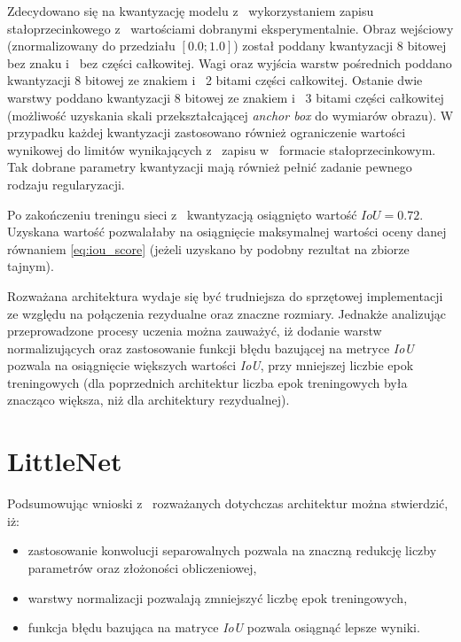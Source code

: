Zdecydowano się na kwantyzację modelu z~ wykorzystaniem zapisu stałoprzecinkowego z~ wartościami dobranymi eksperymentalnie. 
Obraz wejściowy (znormalizowany do przedziału $[0.0;1.0]$) został poddany kwantyzacji 8 bitowej bez znaku i~ bez części całkowitej. 
Wagi oraz wyjścia warstw pośrednich poddano kwantyzacji 8 bitowej ze znakiem i~ 2 bitami części całkowitej.
Ostanie dwie warstwy poddano kwantyzacji 8 bitowej ze znakiem i~ 3 bitami części całkowitej (możliwość uzyskania skali przekształcającej \emph{anchor box} do wymiarów obrazu).
W przypadku każdej kwantyzacji zastosowano również ograniczenie wartości wynikowej do limitów wynikających z~ zapisu w~ formacie stałoprzecinkowym. 
Tak dobrane parametry kwantyzacji mają również pełnić zadanie pewnego rodzaju regularyzacji.

Po zakończeniu treningu sieci z~ kwantyzacją osiągnięto wartość $IoU = 0.72$.
Uzyskana wartość pozwalałaby na osiągnięcie maksymalnej wartości oceny 
danej równaniem \eqref{eq:iou_score} (jeżeli uzyskano by podobny rezultat na zbiorze tajnym).

Rozważana architektura wydaje się być trudniejsza do sprzętowej implementacji ze względu na połączenia rezydualne oraz znaczne rozmiary. 
Jednakże analizując przeprowadzone procesy uczenia można zauważyć, iż dodanie warstw normalizujących oraz zastosowanie funkcji błędu bazującej na metryce \emph{IoU} pozwala na osiągnięcie większych wartości \emph{IoU}, przy mniejszej liczbie epok treningowych 
(dla poprzednich architektur liczba epok treningowych była znacząco większa, niż dla architektury rezydualnej). 


\section{LittleNet}
\label{ch:LN}

Podsumowując wnioski z~ rozważanych dotychczas architektur można stwierdzić, iż:
\begin{itemize}
    \item zastosowanie konwolucji separowalnych pozwala na znaczną redukcję liczby parametrów oraz złożoności obliczeniowej, 
    \item warstwy normalizacji pozwalają zmniejszyć liczbę epok treningowych,
    \item funkcja błędu bazująca na matryce \emph{IoU} pozwala osiągnąć lepsze wyniki.
\end{itemize}

